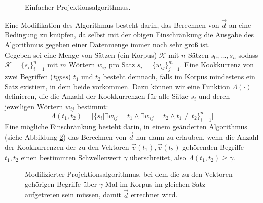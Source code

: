 \begin{figure}[h]
  \centering
  \begin{algorithm}[H]
  \end{algorithm}
  \caption[Einfacher Projektionsalgorithmus]{Einfacher Projektionsalgorithmus.\label{fig:algo1}}
\end{figure}

Eine Modifikation des Algorithmus besteht darin, das Berechnen von $\vec{d}$ an eine Bedingung zu knüpfen, da selbst
mit der obigen Einschränkung die Ausgabe des Algorithmus gegeben einer Datenmenge immer noch sehr groß ist.\\

Gegeben sei eine Menge von Sätzen (ein Korpus) $\mathcal{K}$ mit $n$ Sätzen $s_0, \ldots, s_n$ sodass $\mathcal{K} = \{s_i\}_{i=1}^{n}$ mit
$m$ Wörtern $w_{ij}$ pro Satz $s_i = \{w_{ij}\}_{j=1}^m$. Eine Kookkurrenz von zwei Begriffen (\emph{types}) $t_1$ und $t_2$
besteht demnach, falls im Korpus mindestens ein Satz existiert, in dem beide vorkommen. Dazu können wir
eine Funktion $\Lambda(\cdot)$ definieren, die die Anzahl der Kookkurrenzen für alle Sätze $s_i$ und deren jeweiligen
Wörtern $w_{ij}$ bestimmt:
\begin{equation}\label{form:lambda-cooc}
  \Lambda(t_1, t_2) = |\{s_i | \exists w_{ij} = t_1 \land \exists w_{ij} = t_2 \land t_1\neq t_2\}_{i=1}^{n}|
\end{equation}
Eine mögliche Einschränkung besteht darin, in einem geänderten Algorithmus (siehe Abbildung \ref{fig:algo2}) das Berechnen von $\vec{d}$ nur
dann zu erlauben, wenn die Anzahl der Kookkurrenzen der zu den Vektoren $\vec{v}(t_1), \vec{v}(t_2)$ gehörenden Begriffe $t_1, t_2$
einen bestimmten Schwellenwert $\gamma$ überschreitet, also $\Lambda(t_1, t_2) \geq \gamma$.

\begin{figure}[h]
  \centering
  \begin{algorithm}[H]
  \end{algorithm}
  \caption[Modifizierter Projektionsalgorithmus]{Modifizierter Projektionsalgorithmus, bei dem die zu den Vektoren gehörigen
  Begriffe über $\gamma$ Mal im Korpus im gleichen Satz aufgetreten sein müssen, damit $\vec{d}$ errechnet wird.\label{fig:algo2}}
\end{figure}


